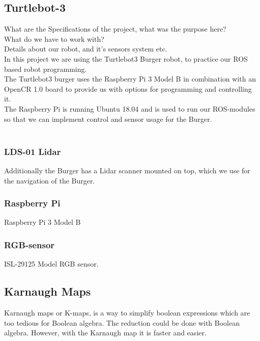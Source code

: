\documentclass{article}
\begin{document}
\subsection*{Turtlebot-3}
What are the Specifications of the project, what was the purpose here?\\
What do we have to work with?\\
Details about our robot, and it's sensors system etc.\\

In this project we are using the Turtlebot3 Burger robot, to practice our ROS based robot programming.\\
The Turtlebot3 burger uses the Raspberry Pi 3 Model B in combination with an OpenCR 1.0 board to 
provide us with options for programming and controlling it. \\
The Raspberry Pi is running Ubuntu 18.04 and is used to run our ROS-modules so that we can 
implement control and sensor usage for the Burger.\\
\\

\subsubsection*{LDS-01 Lidar}
Additionally the Burger has a Lidar scanner mounted on top, which we use for the navigation of the Burger.\\

\subsubsection*{Raspberry Pi}
Raspberry Pi 3 Model B\\

\subsubsection*{RGB-sensor}
ISL-29125 Model RGB sensor.\\

\subsection*{Karnaugh Maps}
Karnaugh maps or K-maps, is a way to simplify boolean expressions which are too tedious for Boolean algebra. The reduction could be
done with Boolean algebra. However, with the Karnaugh map it is faster and easier.
\end{document}
